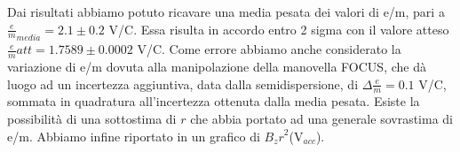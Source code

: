 Dai risultati abbiamo potuto ricavare una media pesata dei valori di e/m, pari a $\frac{e}{m}_{media} = 2.1 \pm 0.2$ V/C. Essa risulta in accordo entro 2 sigma con il valore atteso $\frac{e}{m}{att} = 1.7589 \pm 0.0002$ V/C. Come errore abbiamo anche considerato la variazione di e/m dovuta alla manipolazione della manovella FOCUS, che dà luogo ad un incertezza aggiuntiva, data dalla semidispersione, di $\Delta \frac{e}{m} = 0.1$ V/C, sommata in quadratura all'incertezza ottenuta dalla media pesata. Esiste la possibilità di una sottostima di $r$ che abbia portato ad una generale sovrastima di e/m. Abbiamo infine riportato in  un grafico di ${B_z r}^2$(V$_{acc}$).